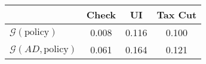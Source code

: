 \begin{tabular}{@{}lccc@{}} 
\toprule 
                          & Check      & UI    & Tax Cut    \\  \midrule 
$\mathcal{G}(\text{policy})$ & 0.008  & 0.116  & 0.100     \\ 
$\mathcal{G}(AD,\text{policy})$ & 0.061  & 0.164  & 0.121     \\ 
\end{tabular}  
